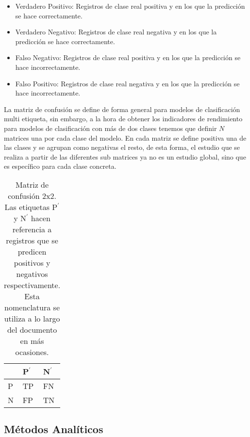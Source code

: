 \begin{itemize}
    \item Verdadero Positivo: Registros de clase real positiva y en los que la predicción se hace correctamente.
    \item Verdadero Negativo: Registros de clase real negativa y en los que la predicción se hace correctamente.
    \item Falso Negativo: Registros de clase real positiva y en los que la predicción se hace incorrectamente.
    \item Falso Positivo: Registros de clase real negativa y en los que la predicción se hace incorrectamente.
\end{itemize}

La matriz de confusión se define de forma general para modelos de clasificación multi etiqueta, sin embargo, a la hora de obtener los indicadores de rendimiento para modelos de clasificación con más de dos clases tenemos que definir $N$ matrices una por cada clase del modelo. En cada matriz se define positiva una de las clases y se agrupan como negativas el resto, de esta forma, el estudio que se realiza a partir de las diferentes sub matrices ya no es un estudio global, sino que es específico para cada clase concreta.

\begin{table}[htp]
    \small
    \centering
    \begin{tabularx}{150pt}{Y Y Y}
            & P$^{\prime}$  & N$^{\prime}$    \\\hline
        P   & TP            & FN              \\\hline
        N   & FP            & TN              \\\hline
    \end{tabularx}

    \caption{Matriz de confusión 2x2. Las etiquetas P$^{\prime}$ y N$^{\prime}$ hacen referencia a registros que se predicen positivos y negativos respectivamente. Esta nomenclatura se utiliza a lo largo del documento en más ocasiones.}
    \label{tab:1}
\end{table}


\subsection{Métodos Analíticos}


